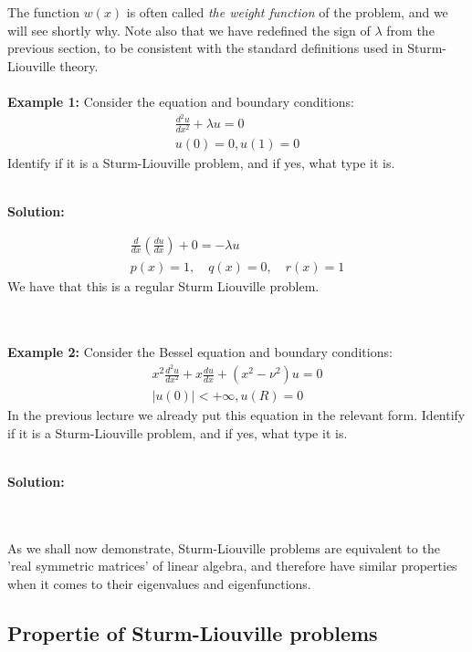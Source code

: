 The function $w(x)$ is often called {\it the weight function} of the problem, and we will see shortly why. Note also that we have redefined the sign of $\lambda$ from the previous section, to be consistent with the standard definitions used in Sturm-Liouville theory. 
\\
\\
{\bf Example 1:} Consider the equation and boundary conditions:
\begin{eqnarray}
\frac{d^2 u}{dx^2} + \lambda u  = 0 \\
u(0) = 0, u(1) = 0
\end{eqnarray}
Identify if it is a Sturm-Liouville problem, and if yes, what type it is.  
\\
\\
{\color{red} {\bf Solution:

\begin{gather*}
    \frac{d}{dx}\left(\frac{du}{dx}\right) + 0 = -\lambda u\\
    p(x) = 1,\quad  q(x) = 0, \quad r(x) = 1
\end{gather*}
We have that this is a regular Sturm Liouville problem. 
} 
}
\\
\\
{\bf Example 2:} Consider the Bessel equation and boundary conditions:
\begin{eqnarray}
x^2 \frac{d^2 u}{dx^2}  + x \frac{d u}{dx}   + (x^2 - \nu^2) u  = 0 \\
|u(0)| < +\infty, u(R) = 0
\end{eqnarray}
In the previous lecture we already put this equation in the relevant form.  
Identify if it is a Sturm-Liouville problem, and if yes, what type it is.  
\\
\\
{\color{red} {\bf Solution:

} 
}
\\
\\
As we shall now demonstrate, Sturm-Liouville problems are equivalent to the 'real symmetric matrices' of linear algebra,  and therefore have similar properties when it comes to their eigenvalues and eigenfunctions. 

\subsection{Propertie of Sturm-Liouville problems} 

